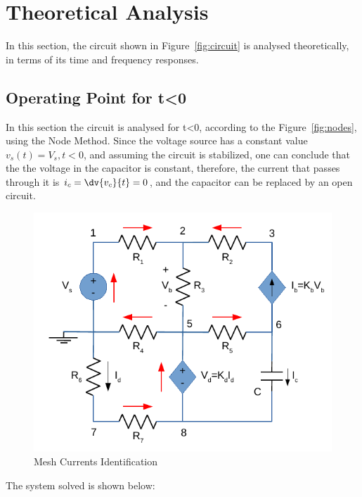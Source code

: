 \section{Theoretical Analysis}
\label{sec:analysis}

In this section, the circuit shown in Figure~\ref{fig:circuit} is analysed
theoretically, in terms of its time and frequency responses.

\subsection{Operating Point for t<0}
\label{subsec:tb0}

In this section the circuit is analysed for t<0, according to the Figure~\ref{fig:nodes}, using the Node Method. Since the voltage source has a constant value $v_s(t)=V_s, t<0$, and assuming the circuit is stabilized, one can conclude that the the voltage in the capacitor is constant, therefore, the current that passes through it is $i_c=\dv{v_c}{t}=0$, and the capacitor can be replaced by an open circuit.\par

\begin{figure}[H] \centering
  \includegraphics[width=0.7\linewidth]{NodeMethod.pdf}
  \caption{Mesh Currents Identification}
  \label{fig:NodeMethod}
\end{figure}

The system solved is shown below:\par

